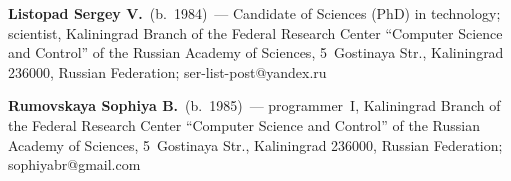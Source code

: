 \vspace*{3pt}

\noindent
\textbf{Listopad Sergey V.}\ (b.\ 1984)~---
Candidate of  Sciences (PhD) in technology; scientist, Kaliningrad Branch of the 
Federal Research Center ``Computer Science and Control'' of the Russian Academy 
of Sciences, 5~Gostinaya Str., Kaliningrad 236000,  Russian Federation;  ser-list-post@yandex.ru

\vspace*{3pt}

\noindent
\textbf{Rumovskaya Sophiya B.}\ (b.\ 1985)~--- programmer~I, Kaliningrad Branch 
of the Federal Research Center ``Computer Science and Control'' of the Russian 
Academy of Sciences, 5~Gostinaya Str., Kaliningrad 236000,  Russian Federation; sophiyabr@gmail.com
\label{end\stat}


\renewcommand{\bibname}{\protect\rm Литература}